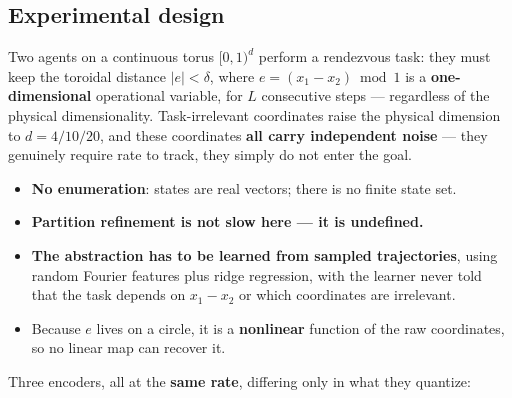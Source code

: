 \documentclass[11pt]{article}
\providecommand{\tightlist}{%
  \setlength{\itemsep}{0pt}\setlength{\parskip}{0pt}}
\begin{document}
\hypertarget{experimental-design}{%
\subsection{Experimental design}\label{experimental-design}}

Two agents on a continuous torus \([0,1)^d\) perform a rendezvous task: they must keep the toroidal distance \(|e|<\delta\), where \(e=(x_1-x_2)\bmod1\) is a \textbf{one-dimensional} operational variable, for \(L\) consecutive steps --- regardless of the physical dimensionality. Task-irrelevant coordinates raise the physical dimension to \(d=4/10/20\), and these coordinates \textbf{all carry independent noise} --- they genuinely require rate to track, they simply do not enter the goal.

\begin{itemize}
\tightlist
\item
  \textbf{No enumeration}: states are real vectors; there is no finite state set.
\item
  \textbf{Partition refinement is not slow here --- it is undefined.}
\item
  \textbf{The abstraction has to be learned from sampled trajectories}, using random Fourier features plus ridge regression, with the learner never told that the task depends on \(x_1-x_2\) or which coordinates are irrelevant.
\item
  Because \(e\) lives on a circle, it is a \textbf{nonlinear} function of the raw coordinates, so no linear map can recover it.
\end{itemize}

Three encoders, all at the \textbf{same rate}, differing only in what they quantize:
\end{document}
